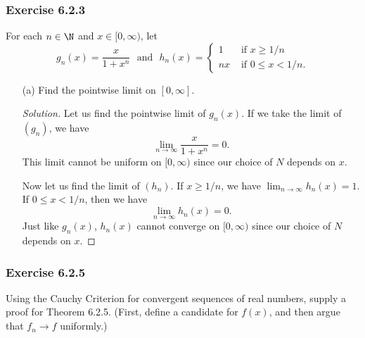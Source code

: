\subsubsection{Exercise 6.2.3} For each \( n \in \N  \) and \( x \in [0,\infty ) \), let 
\[  g_n(x) = \frac{ x  }{ 1 + x^n } \text{~ and ~} h_n(x) = 
\begin{cases}
    1 &\text{~if~} x \geq 1 /n \\
    nx &\text{~if~} 0 \leq x < 1 / n.
\end{cases}  \]

\begin{enumerate}
    \item[(a)] Find the pointwise limit on \( [0,\infty ] \).
        \begin{proof}[Solution]
        Let us find the pointwise limit of \( g_n(x)  \). If we take the limit of \( (g_n) \), we have
        \[  \lim_{ n \to \infty  } \frac{ x  }{ 1 + x^n  } = 0. \] This limit cannot be uniform on \( [0,\infty ) \) since our choice of \( N  \) depends on \( x  \). 

        Now let us find the limit of \( (h_n)  \). If \( x \geq 1 / n  \), we have \( \lim_{  n \to \infty  } h_n(x) = 1  \). If \( 0 \leq x < 1 / n \), then we have 
        \[  \lim_{ n \to \infty  } h_n(x) = 0. \]
        Just like \( g_n(x)  \), \( h_n(x)  \) cannot converge on \( [0,\infty )  \) since our choice of \( N  \) depends on \( x  \).
        \end{proof}
\end{enumerate}



\subsubsection{Exercise 6.2.5}  Using the Cauchy Criterion for convergent sequences of real numbers, supply a proof for Theorem 6.2.5. (First, define a candidate for \( f(x)  \), and then argue that \( f_n \to f  \) uniformly.)

